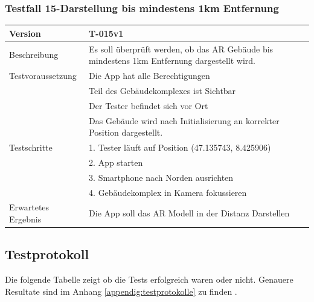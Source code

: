 \documentclass[a4paper]{scrreprt}
\begin{document}
\subsubsection{Testfall 15-Darstellung bis mindestens 1km Entfernung}
\begin{tabularx}{\textwidth}{|l|X|}
\hline 
	Version &
	T-015v1 \\ 
\hline 
	Beschreibung & 
	Es soll überprüft werden, ob das AR Gebäude bis mindestens 1km Entfernung dargestellt wird. \\ 
\hline 
	Testvoraussetzung &
	Die App hat alle Berechtigungen \\ &
	Teil des Gebäudekomplexes ist Sichtbar \\ &
	Der Tester befindet sich vor Ort \\ &
	Das Gebäude wird nach Initialisierung an korrekter Position dargestellt. \\
\hline 
	Testschritte & 
		1. Tester läuft auf Position (47.135743, 8.425906) \\ &
		2. App starten \\ &
		3. Smartphone nach Norden ausrichten\\ &
		4. Gebäudekomplex in Kamera fokussieren\\ 
\hline
	Erwartetes Ergebnis &
	Die App soll das AR Modell in der Distanz Darstellen \\ 
\hline 
\end{tabularx}
\subsection{Testprotokoll}
\label{ch:testprotokoll}
Die folgende Tabelle zeigt ob die Tests erfolgreich waren oder nicht. Genauere Resultate sind im Anhang \ref{appendig:testprotokolle} zu finden . 
\bigbreak
\end{document}
